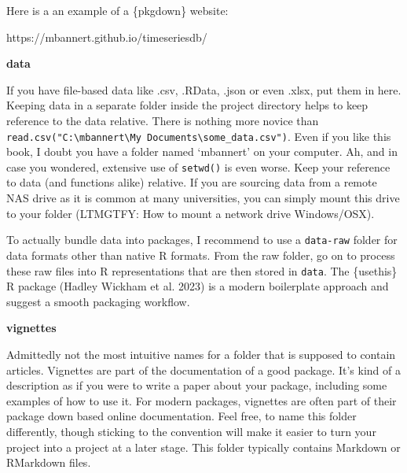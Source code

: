 \documentclass[
  12pt,
  letterpaper,
]{krantz}
\begin{document}
Here is a an example of a \{pkgdown\} website:

https://mbannert.github.io/timeseriesdb/

\textbf{data}

If you have file-based data like .csv, .RData, .json or even .xlsx, put
them in here. Keeping data in a separate folder inside the project
directory helps to keep reference to the data relative. There is nothing
more novice than
\texttt{read.csv("C:\textbackslash{}mbannert\textbackslash{}My\ Documents\textbackslash{}some\_data.csv")}.
Even if you like this book, I doubt you have a folder named `mbannert'
on your computer. Ah, and in case you wondered, extensive use of
\texttt{setwd()} is even worse. Keep your reference to data (and
functions alike) relative. If you are sourcing data from a remote NAS
drive as it is common at many universities, you can simply mount this
drive to your folder (LTMGTFY: How to mount a network drive
Windows/OSX).

\begin{tcolorbox}[enhanced jigsaw, left=2mm, arc=.35mm, colbacktitle=quarto-callout-note-color!10!white, breakable, colframe=quarto-callout-note-color-frame, bottomrule=.15mm, bottomtitle=1mm, colback=white, leftrule=.75mm, coltitle=black, toptitle=1mm, titlerule=0mm, title=\textcolor{quarto-callout-note-color}{\faInfo}\hspace{0.5em}{Note}, opacityback=0, rightrule=.15mm, toprule=.15mm, opacitybacktitle=0.6]

To actually bundle data into packages, I recommend to use a
\texttt{data-raw} folder for data formats other than native R formats.
From the raw folder, go on to process these raw files into R
representations that are then stored in \texttt{data}. The \{usethis\} R
package (Hadley Wickham et al. 2023) is a modern boilerplate approach
and suggest a smooth packaging workflow.

\end{tcolorbox}

\textbf{vignettes}

Admittedly not the most intuitive names for a folder that is supposed to
contain articles. Vignettes are part of the documentation of a good
package. It's kind of a description as if you were to write a paper
about your package, including some examples of how to use it. For modern
packages, vignettes are often part of their package down based online
documentation. Feel free, to name this folder differently, though
sticking to the convention will make it easier to turn your project into
a project at a later stage. This folder typically contains Markdown or
RMarkdown files.
\end{document}
